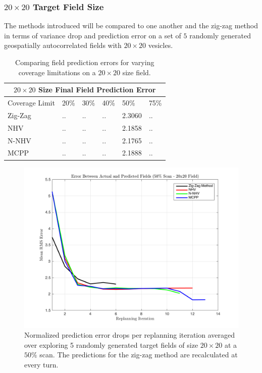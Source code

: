 \subsubsection{$20 \times 20$ Target Field Size}
The methods introduced will be compared to one another and the zig-zag method in terms of variance drop and prediction error on a set of $5$ randomly generated geospatially autocorrelated fields with $20\times20$ vesicles.

\begin{table}[ht!]
\centering
	\begin{tabular}{ |p{3cm}||p{1cm}|p{1cm}|p{1cm}|p{1cm}|p{1cm}|  }
		\hline
		\multicolumn{6}{|c|}{$20 \times 20$ Size Final Field Prediction Error} \\
		\hline
		Coverage Limit & 20\% & 30\% & 40\% & 50\% & 75\% \\
		\hline
		Zig-Zag        & .. & .. & .. & 2.3060 & .. \\
		NHV            & .. & .. & .. & 2.1858 & .. \\
		N-NHV          & .. & .. & .. & 2.1765 & .. \\
		MCPP           & .. & .. & .. & 2.1888 & .. \\
		\hline
	\end{tabular}
	\caption{Comparing field prediction errors for varying coverage limitations on a $20 \times 20$ size field.}
    \label{tab:20fieldprederr}
\end{table}

\begin{figure}[hb!]
	\centering
	\includegraphics[width=0.8\linewidth]{figures/pred_error_20x20_50percent_5runs.png}
    \captionsetup{skip=0.20\baselineskip,size=footnotesize}
	\caption{Normalized prediction error drops per replanning iteration averaged over exploring 5 randomly generated target fields of size $20 \times 20$ at a $50\%$ scan. The predictions for the zig-zag method are recalculated at every turn.}
\end{figure}

